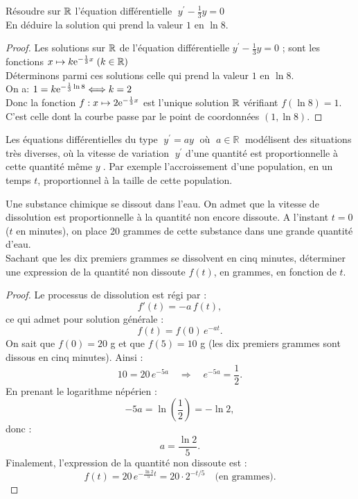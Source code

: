 \begin{exercice}
Résoudre sur $ \mathbb{R} $ l'équation  différentielle  $ \; y^{\prime}-\frac{1}{3}y=0 $\\ 
En déduire la solution qui prend la valeur $1 $ en $ \ln 8$.

\end{exercice}
\begin{proof}
Les solutions sur $ \mathbb{R} $ de l'équation  différentielle \; $ y^{\prime}-\frac{1}{3}y=0 $\; ; \; sont les fonctions  $ x\mapsto k\mathrm{e}^{-\frac{1}{3}x}\; (k\in\mathbb{R}) $\\
Déterminons parmi ces solutions celle qui prend la valeur $1 $ en $ \ln 8$.\\ On a:\; $ 1=k\mathrm{e}^{-\frac{1}{3}\ln 8} \Longleftrightarrow k=2$\\
Donc la fonction \;$f:  x\mapsto 2\mathrm{e}^{-\frac{1}{3}x} $  est l'unique solution $ \mathbb{R} $  vérifiant \;$ f(\ln 8)=1 $. C'est celle  dont la courbe passe par le point de coordonnées \;$ (1, \ln 8) $.
\end{proof}
\begin{remark}
Les équations différentielles du type $\;  y^{\prime}=ay \; $ où  $\;  a\in\mathbb{R}\;  $  modélisent des situations très diverses, où la vitesse  de variation $\;   y^{\prime} $ d'une quantité est proportionnelle à cette quantité même $ y \; $. Par exemple l'accroissement d'une population, en un temps $ t $, proportionnel à  la taille de cette population.
\end{remark}
\begin{exercice}
Une substance chimique se dissout dans l'eau. On admet que la vitesse de dissolution est
proportionnelle à la quantité non encore dissoute. A l'instant $t=0$ ($t$ en minutes), on place 20 grammes
de cette substance dans une grande quantité d'eau.\\
Sachant que les dix premiers grammes se dissolvent en cinq minutes, déterminer une expression de la
quantité non dissoute $f(t)$, en grammes, en fonction de $t$.
\end{exercice}
\begin{proof}
Le processus de dissolution  est régi par :
\[
f'(t) = -a\,f(t),
\]
ce qui admet pour solution générale :
\[
f(t) = f(0)\,e^{-a t}.
\]
On sait que \(f(0) = 20\) g et que \(f(5) = 10\) g (les dix premiers grammes sont dissous en cinq minutes).  
Ainsi :
\[
10 = 20\,e^{-5a} \quad\Longrightarrow\quad e^{-5a} = \frac12.
\]
En prenant le logarithme népérien :
\[
-5a = \ln\left(\frac12\right) = -\ln 2,
\]
donc :
\[
a = \dfrac{\ln 2}{5}.
\]
Finalement, l'expression de la quantité non dissoute est :
\[
f(t) = 20\,e^{-\frac{\ln 2}{5}t} = 20 \cdot 2^{-t/5} \quad \text{(en grammes)}.
\]

\end{proof}
